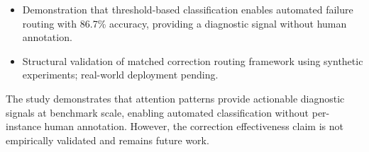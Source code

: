 \begin{itemize}
\item Demonstration that threshold-based classification enables automated failure routing with 86.7\% accuracy, providing a diagnostic signal without human annotation.
\end{itemize}

\begin{itemize}
\item Structural validation of matched correction routing framework using synthetic experiments; real-world deployment pending.
\end{itemize}

The study demonstrates that attention patterns provide actionable diagnostic signals at benchmark scale, enabling automated classification without per-instance human annotation. However, the correction effectiveness claim is not empirically validated and remains future work.
